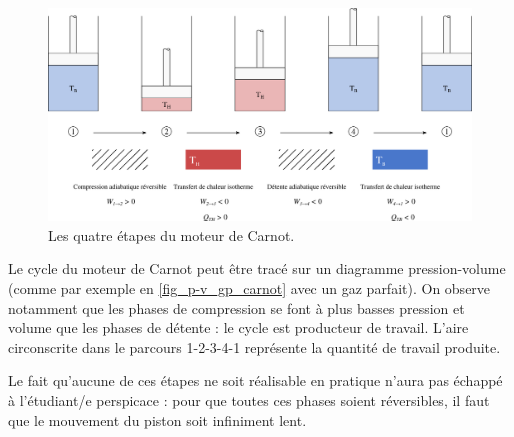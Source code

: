 		\begin{landscape}

		\begin{figure}
			\begin{center}
				\includegraphics[width=\linewidth]{images/carnot_description_complete.png}
			\end{center}
			\caption{Les quatre étapes du moteur de Carnot.}
			\label{fig_carnot_quatre_etapes}
		\end{figure}

		\end{landscape}

		Le cycle du moteur de Carnot peut être tracé sur un diagramme pression-volume (comme par exemple en \cref{fig_p-v_gp_carnot} avec un gaz parfait). On observe notamment que les phases de compression se font à plus basses pression et volume que les phases de détente : le cycle est producteur de travail. L’aire circonscrite dans le parcours 1-2-3-4-1 représente la quantité de travail produite.

		Le fait qu’aucune de ces étapes ne soit réalisable en pratique n’aura pas échappé à l’étudiant/e perspicace : pour que toutes ces phases soient réversibles, il faut que le mouvement du piston soit infiniment lent.

